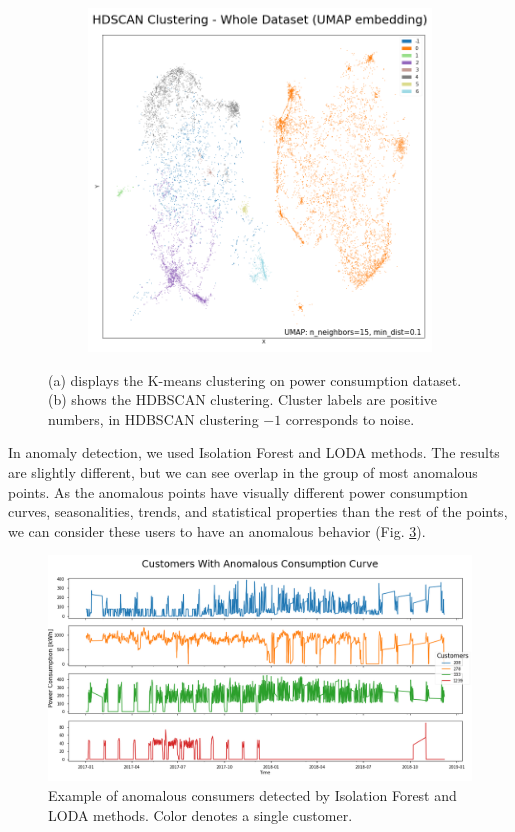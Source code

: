 \begin{figure}[H]
\begin{subfigure}[b]{0.495\textwidth}
    \includegraphics[width=\textwidth]{img/all-data-umap-hdbscan.png}
    \caption{}
    \label{fig:all-data-hdbscan}
 \end{subfigure}
\caption{
    (a) displays the K-means clustering on power consumption dataset. (b) shows the HDBSCAN clustering. Cluster labels are positive numbers, in HDBSCAN clustering $-1$ corresponds to noise.
}
\label{fig:all-data-umap}
\end{figure}

In anomaly detection, we used Isolation Forest and LODA methods. The results are slightly different, but we can see overlap in the group of most anomalous points. As the anomalous points have visually different power consumption curves, seasonalities, trends, and statistical properties than the rest of the points, we can consider these users to have an anomalous behavior (Fig. \ref{fig:anomalous-users}).
\begin{figure}[htp!]
    \centering
    \includegraphics[width=\textwidth]{img/anomalous-users.png}
    \caption{Example of anomalous consumers detected by Isolation Forest and LODA methods. Color denotes a single customer.}
    \label{fig:anomalous-users}
\end{figure}

